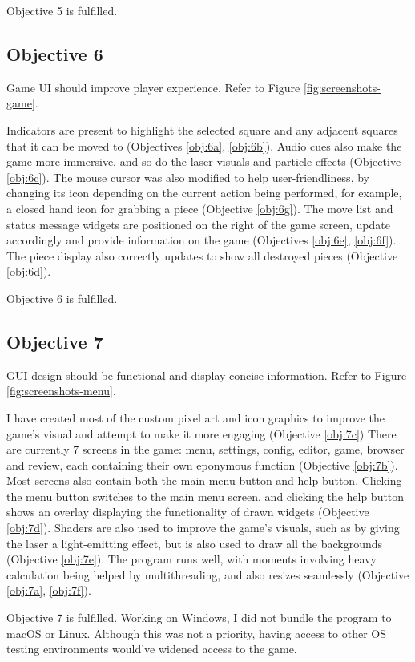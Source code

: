 \documentclass[../main/main.tex]{subfiles}
\begin{document}
Objective 5 is fulfilled.

\subsection{Objective 6}
Game UI should improve player experience. Refer to Figure \ref{fig:screenshots-game}.

Indicators are present to highlight the selected square and any adjacent squares that it can be moved to (Objectives \ref{obj:6a}, \ref{obj:6b}). Audio cues also make the game more immersive, and so do the laser visuals and particle effects (Objective \ref{obj:6c}). The mouse cursor was also modified to help user-friendliness, by changing its icon depending on the current action being performed, for example, a closed hand icon for grabbing a piece (Objective \ref{obj:6g}). The move list and status message widgets are positioned on the right of the game screen, update accordingly and provide information on the game (Objectives \ref{obj:6e}, \ref{obj:6f}). The piece display also correctly updates to show all destroyed pieces (Objective \ref{obj:6d}).

Objective 6 is fulfilled.

\subsection{Objective 7}
GUI design should be functional and display concise information. Refer to Figure \ref{fig:screenshots-menu}.

I have created most of the custom pixel art and icon graphics to improve the game's visual and attempt to make it more engaging (Objective \ref{obj:7c}) There are currently 7 screens in the game: menu, settings, config, editor, game, browser and review, each containing their own eponymous function (Objective \ref{obj:7b}). Most screens also contain both the main menu button and help button. Clicking the menu button switches to the main menu screen, and clicking the help button shows an overlay displaying the functionality of drawn widgets (Objective \ref{obj:7d}). Shaders are also used to improve the game's visuals, such as by giving the laser a light-emitting effect, but is also used to draw all the backgrounds (Objective \ref{obj:7e}). The program runs well, with moments involving heavy calculation being helped by multithreading, and also resizes seamlessly (Objective \ref{obj:7a}, \ref{obj:7f}).

Objective 7 is fulfilled. Working on Windows, I did not bundle the program to macOS or Linux. Although this was not a priority, having access to other OS testing environments would've widened access to the game.
\end{document}
